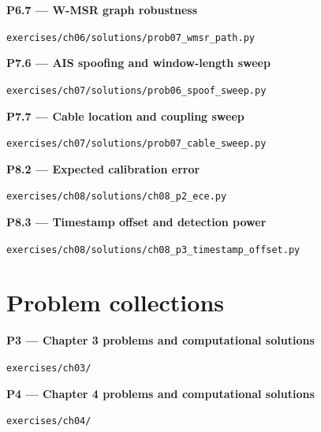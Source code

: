 \documentclass[graybox,envcountchap]{style/SNmono}
\newcommand{\repopath}[1]{\texttt{#1}}
\begin{document}
\par\medskip{}\label{code:P6.7}
\noindent\textbf{P6.7 --- W-MSR graph robustness}\par
\noindent\repopath{exercises/\allowbreak ch06/\allowbreak solutions/\allowbreak prob07\_\allowbreak wmsr\_\allowbreak path.py}\par

\par\medskip{}\label{code:P7.6}
\noindent\textbf{P7.6 --- AIS spoofing and window-length sweep}\par
\noindent\repopath{exercises/\allowbreak ch07/\allowbreak solutions/\allowbreak prob06\_\allowbreak spoof\_\allowbreak sweep.py}\par

\par\medskip{}\label{code:P7.7}
\noindent\textbf{P7.7 --- Cable location and coupling sweep}\par
\noindent\repopath{exercises/\allowbreak ch07/\allowbreak solutions/\allowbreak prob07\_\allowbreak cable\_\allowbreak sweep.py}\par

\par\medskip{}\label{code:P8.2}
\noindent\textbf{P8.2 --- Expected calibration error}\par
\noindent\repopath{exercises/\allowbreak ch08/\allowbreak solutions/\allowbreak ch08\_\allowbreak p2\_\allowbreak ece.py}\par

\par\medskip{}\label{code:P8.3}
\noindent\textbf{P8.3 --- Timestamp offset and detection power}\par
\noindent\repopath{exercises/\allowbreak ch08/\allowbreak solutions/\allowbreak ch08\_\allowbreak p3\_\allowbreak timestamp\_\allowbreak offset.py}\par

\section*{Problem collections}

\par\medskip{}\label{code:P3}
\noindent\textbf{P3 --- Chapter 3 problems and computational solutions}\par
\noindent\repopath{exercises/\allowbreak ch03/\allowbreak }\par

\par\medskip{}\label{code:P4}
\noindent\textbf{P4 --- Chapter 4 problems and computational solutions}\par
\noindent\repopath{exercises/\allowbreak ch04/\allowbreak }\par
\end{document}
